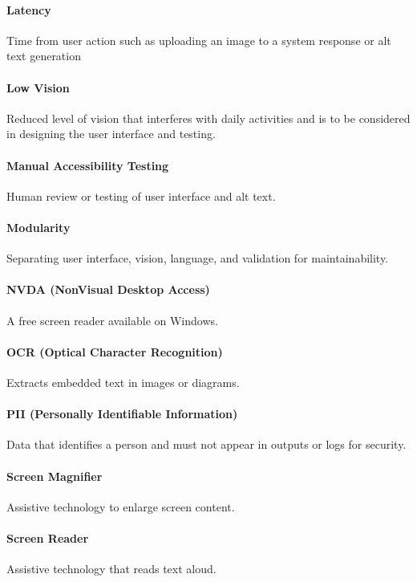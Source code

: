 \documentclass[12pt]{article}
\begin{document}
\paragraph*{Latency}
Time from user action such as uploading an image to a system response or alt text generation

\paragraph*{Low Vision}
Reduced level of vision that interferes with daily activities and is to be considered in designing the user interface and testing.

\paragraph*{Manual Accessibility Testing}
Human review or testing of user interface and alt text.

\paragraph*{Modularity}
Separating user interface, vision, language, and validation for maintainability.

\paragraph*{NVDA (NonVisual Desktop Access)}
A free screen reader available on Windows.

\paragraph*{OCR (Optical Character Recognition)}
Extracts embedded text in images or diagrams.

\paragraph*{PII (Personally Identifiable Information)}
Data that identifies a person and must not appear in outputs or logs for security.

\paragraph*{Screen Magnifier}
Assistive technology to enlarge screen content.

\paragraph*{Screen Reader}
Assistive technology that reads text aloud.
\end{document}
